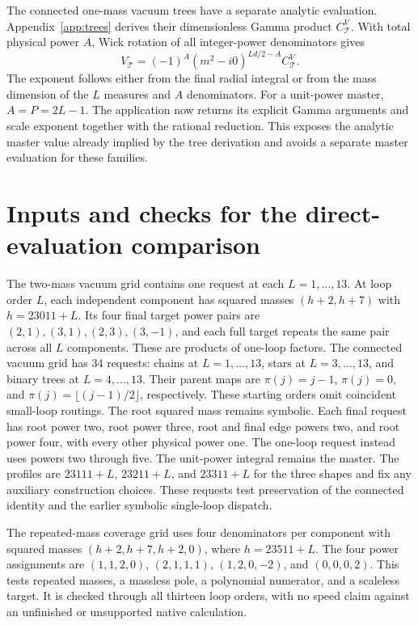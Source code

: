The connected one-mass vacuum trees have a separate analytic evaluation. Appendix~\ref{app:trees} derives their dimensionless Gamma product $C^V_{\mathcal T}$. With total physical power $A$, Wick rotation of all integer-power denominators gives
\begin{equation}
 V_{\mathcal T}=(-1)^A(m^2-i0)^{Ld/2-A}C^V_{\mathcal T}.
 \label{eq:direct-tree-value}
\end{equation}
The exponent follows either from the final radial integral or from the mass dimension of the $L$ measures and $A$ denominators. For a unit-power master, $A=P=2L-1$. The application now returns its explicit Gamma arguments and scale exponent together with the rational reduction. This exposes the analytic master value already implied by the tree derivation and avoids a separate master evaluation for these families.

\section{Inputs and checks for the direct-evaluation comparison}
\label{app:direct-inputs}
The two-mass vacuum grid contains one request at each $L=1,\ldots,13$. At loop order $L$, each independent component has squared masses $(h+2,h+7)$ with $h=23011+L$. Its four final target power pairs are $(2,1),(3,1),(2,3),(3,-1)$, and each full target repeats the same pair across all $L$ components. These are products of one-loop factors. The connected vacuum grid has 34 requests: chains at $L=1,\ldots,13$, stars at $L=3,\ldots,13$, and binary trees at $L=4,\ldots,13$. Their parent maps are $\pi(j)=j-1$, $\pi(j)=0$, and $\pi(j)=\lfloor(j-1)/2\rfloor$, respectively. These starting orders omit coincident small-loop routings. The root squared mass remains symbolic. Each final request has root power two, root power three, root and final edge powers two, and root power four, with every other physical power one. The one-loop request instead uses powers two through five. The unit-power integral remains the master. The profiles are $23111+L$, $23211+L$, and $23311+L$ for the three shapes and fix any auxiliary construction choices. These requests test preservation of the connected identity and the earlier symbolic single-loop dispatch.

The repeated-mass coverage grid uses four denominators per component with squared masses $(h+2,h+7,h+2,0)$, where $h=23511+L$. The four power assignments are $(1,1,2,0)$, $(2,1,1,1)$, $(1,2,0,-2)$, and $(0,0,0,2)$. This tests repeated masses, a massless pole, a polynomial numerator, and a scaleless target. It is checked through all thirteen loop orders, with no speed claim against an unfinished or unsupported native calculation.

